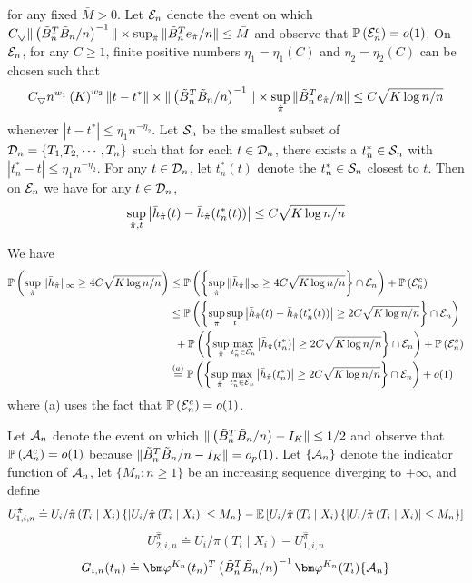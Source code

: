 for any fixed $\bar{M}>0$. Let $\mathcal{\mathcal{E}}_{n}$ denote the event on which $C_{\bigtriangledown}\|\left(\tilde{B}_n^{T}\tilde{B}_n/n\right)^{-1}\|\times\sup_{\hat{\pi}}\|\tilde{B}_n^{T}e_{\hat{\pi}}/n\|\leq\bar{M}$
and observe that $\mathbb{P}\left(\mathcal{\mathcal{E}}_{n}^{c}\right)=o(1)$. On $\mathcal{\mathcal{E}}_{n}$, for any
$C\geq1$, finite positive numbers $\eta_{1}=\eta_{1}(C)$ and $\eta_{2}=\eta_{2}(C)$
can be chosen such that
\[
C_{\bigtriangledown}n^{w_{1}}\left(K\right)^{w_{2}}\|t-t^{*}\|\times\|\left(\tilde{B}_n^{T}\tilde{B}_n/n\right)^{-1}\|\times\sup_{\hat{\pi}}\|\tilde{B}_n^{T}e_{\hat{\pi}}/n\|\leq C\sqrt{K\log n/n}
\]
whenever $\left|t-t^{*}\right|\leq\eta_{1}n^{-\eta_{2}}$. Let $\mathcal{S}_{n}$
be the smallest subset of $\mathcal{D}_{n}=\left\{ T_{1,}T_{2,}\cdots,T_{n}\right\} $
such that for each $t\in\mathcal{D}_{n}$, there exists a $t_{n}^*\in\mathcal{S}_{n}$ with
$|t_{n}^*-t|\leq\eta_{1}n^{-\eta_{2}}$. For any $t\in\mathcal{D}_{n}$, let $t_{n}^*(t)$
denote the $t_{n}^*\in\mathcal{S}_{n}$ closest to $t$. Then on $\mathcal{\mathcal{E}}_{n}$ we have
for any $t\in\mathcal{D}_{n}$,
\[
\sup_{\hat{\pi},t}\left|\bar{h}_{\hat{\pi}}(t)-\bar{h}_{\hat{\pi}}(t_{n}^*(t))\right|\leq C\sqrt{K\log n/n}
\]

We have
\begin{align*}
\mathbb{P}\left(\sup_{\hat{\pi}}\|\bar{h}_{\hat{\pi}}\|_{\infty}\geq4C\sqrt{K\log n/n}\right) & \leq\mathbb{P}\left(\left\{ \sup_{\hat{\pi}}\|\bar{h}_{\hat{\pi}}\|_{\infty}\geq4C\sqrt{K\log n/n}\right\} \cap\mathcal{\mathcal{E}}_{n}\right)+\mathbb{P}\left(\mathcal{\mathcal{E}}_{n}^{c}\right)\\
 & \leq\mathbb{P}\left(\left\{ \sup_{\hat{\pi}}\sup_{t}\left|\bar{h}_{\hat{\pi}}(t)-\bar{h}_{\hat{\pi}}(t_{n}^*(t))\right|\geq2C\sqrt{K\log n/n}\right\} \cap\mathcal{\mathcal{E}}_{n}\right)\\
 & \,\,\,+\mathbb{P}\left(\left\{ \sup_{\hat{\pi}}\max_{t_{n}^*\in\mathcal{\mathcal{E}}_{n}}\left|\bar{h}_{\hat{\pi}}(t_{n}^*)\right|\geq2C\sqrt{K\log n/n}\right\} \cap\mathcal{\mathcal{E}}_{n}\right)+\mathbb{P}\left(\mathcal{\mathcal{E}}_{n}^{c}\right)\\
 & \stackrel{(a)}{=}\mathbb{P}\left(\left\{ \sup_{\hat{\pi}}\max_{t_{n}^*\in\mathcal{\mathcal{E}}_{n}}\left|\bar{h}_{\hat{\pi}}(t_{n}^*)\right|\geq2C\sqrt{K\log n/n}\right\} \cap\mathcal{\mathcal{E}}_{n}\right)+o(1)
\end{align*}
where (a) uses the fact that $\mathbb{P}\left(\mathcal{\mathcal{E}}_{n}^{c}\right)=o(1)$.

Let $\mathcal{A}_{n}$ denote the event on which $\|\left(\tilde{B}_n^{T}\tilde{B}_n/n\right)-I_{K}\|\leq1/2$
and observe that $\mathbb{P}\left(\mathcal{A}_{n}^{c}\right)=o(1)$ because $\|\tilde{B}_n^{T}\tilde{B}_n/n-I_{K}\|=o_{p}(1)$.
Let $\{\mathcal{A}_{n}\}$ denote the indicator function of $\mathcal{A}_{n}$, let $\{M_{n}:n\geq1\}$
be an increasing sequence diverging to $+\infty$, and define
\[
U_{1,i,n}^{\hat{\pi}}\doteq U_{i}/\hat{\pi}\left(T_{i}\mid X_{i}\right)\left\{ \left|U_{i}/\hat{\pi}\left(T_{i}\mid X_{i}\right)\right|\leq M_{n}\right\} -\mathbb{E}\left[U_{i}/\hat{\pi}\left(T_{i}\mid X_{i}\right)\left\{ \left|U_{i}/\hat{\pi}\left(T_{i}\mid X_{i}\right)\right|\leq M_{n}\right\} \right]
\]
\[
U_{2,i,n}^{\hat{\pi}}\doteq U_{i}/\hat{\pi}\left(T_{i}\mid X_{i}\right)-U_{1,i,n}^{\hat{\pi}}
\]
\[
G_{i,n}(t_{n})\doteq\vpk(t_{n})^{T}\left(\tbn^{T}\tbn/n\right)^{-1}\vpk(T_{i})\{\An\}
\]

